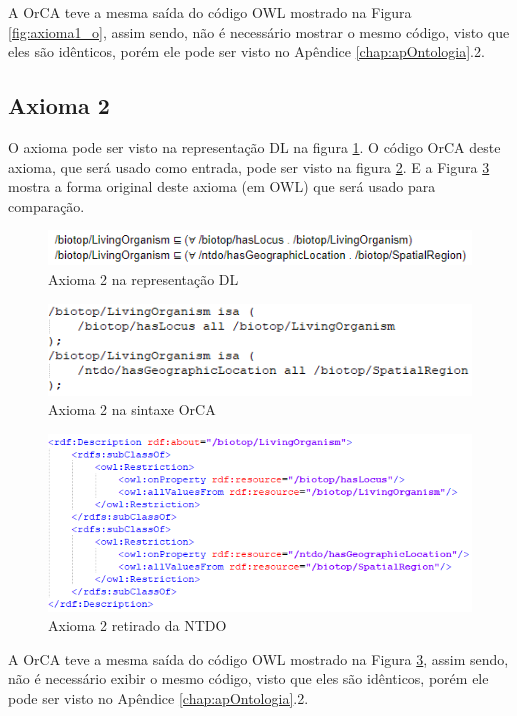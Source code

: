 \documentclass{bcc}
\begin{document}
A OrCA teve a mesma saída do código OWL mostrado na Figura \ref{fig:axioma1_o}, assim sendo, não é necessário mostrar o mesmo código, visto que eles são idênticos, porém ele pode ser visto no Apêndice \ref{chap:apOntologia}.2.

\subsection{Axioma 2}
O axioma pode ser visto na representação DL na figura \ref{fig:axioma2_dl}. O código OrCA deste axioma, que será usado como entrada, pode ser visto na figura \ref{fig:axioma2_orca}. E a Figura \ref{fig:axioma2_o} mostra a forma original deste axioma (em OWL) que será usado para comparação. 

\begin{figure}[H]
\centering
\includegraphics[width=.7\textwidth]{Figuras/axioma2_dl.png}
\caption{Axioma 2 na representação DL} 
\label{fig:axioma2_dl}
\end{figure}

\begin{figure}[H]
\centering
\includegraphics[width=.7\textwidth]{Figuras/axioma2_orca.png}
\caption{Axioma 2 na sintaxe OrCA} 
\label{fig:axioma2_orca}
\end{figure}

\begin{figure}[H]
\centering
\includegraphics[width=.8\textwidth]{Figuras/axioma2_o.png}
\caption{Axioma 2 retirado da NTDO} 
\label{fig:axioma2_o}
\end{figure}

A OrCA teve a mesma saída do código OWL mostrado na Figura \ref{fig:axioma2_o}, assim sendo, não é necessário exibir o mesmo código, visto que eles são idênticos, porém ele pode ser visto no Apêndice \ref{chap:apOntologia}.2.
\end{document}
